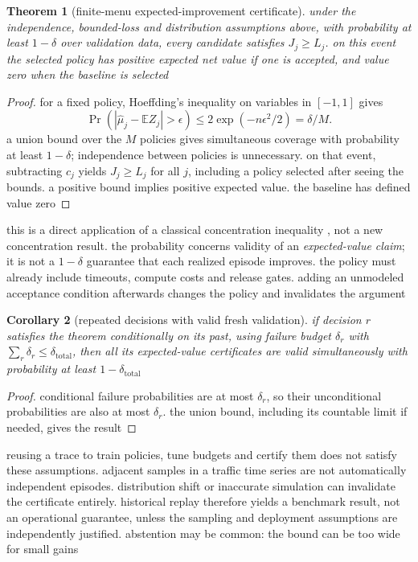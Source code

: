 \documentclass[11pt,a4paper]{article}
\newtheorem{theorem}{Theorem}
\newtheorem{corollary}[theorem]{Corollary}
\newcommand{\E}{\mathbb{E}}
\newcommand{\1}{\mathbf{1}}
\begin{document}
\begin{theorem}[finite-menu expected-improvement certificate]\label{thm:certificate}
under the independence, bounded-loss and distribution assumptions above, with probability at least $1-\delta$ over validation data, every candidate satisfies $J_j\ge L_j$. on this event the selected policy has positive expected net value if one is accepted, and value zero when the baseline is selected
\end{theorem}
\begin{proof}
for a fixed policy, Hoeffding's inequality on variables in $[-1,1]$ gives
\begin{equation*}
 \Pr\left(|\widehat\mu_j-\E Z_j|>\epsilon\right)\le2\exp(-n\epsilon^2/2)=\delta/M.
\end{equation*}
a union bound over the $M$ policies gives simultaneous coverage with probability at least $1-\delta$; independence between policies is unnecessary. on that event, subtracting $c_j$ yields $J_j\ge L_j$ for all $j$, including a policy selected after seeing the bounds. a positive bound implies positive expected value. the baseline has defined value zero
\end{proof}
this is a direct application of a classical concentration inequality \cite{hoeffding}, not a new concentration result. the probability concerns validity of an \emph{expected-value claim}; it is not a $1-\delta$ guarantee that each realized episode improves. the policy must already include timeouts, compute costs and release gates. adding an unmodeled acceptance condition afterwards changes the policy and invalidates the argument

\begin{corollary}[repeated decisions with valid fresh validation]
if decision $r$ satisfies the theorem conditionally on its past, using failure budget $\delta_r$ with $\sum_r\delta_r\le\delta_{\mathrm{total}}$, then all its expected-value certificates are valid simultaneously with probability at least $1-\delta_{\mathrm{total}}$
\end{corollary}
\begin{proof}
conditional failure probabilities are at most $\delta_r$, so their unconditional probabilities are also at most $\delta_r$. the union bound, including its countable limit if needed, gives the result
\end{proof}
reusing a trace to train policies, tune budgets and certify them does not satisfy these assumptions. adjacent samples in a traffic time series are not automatically independent episodes. distribution shift or inaccurate simulation can invalidate the certificate entirely. historical replay therefore yields a benchmark result, not an operational guarantee, unless the sampling and deployment assumptions are independently justified. abstention may be common: the bound can be too wide for small gains
\end{document}
